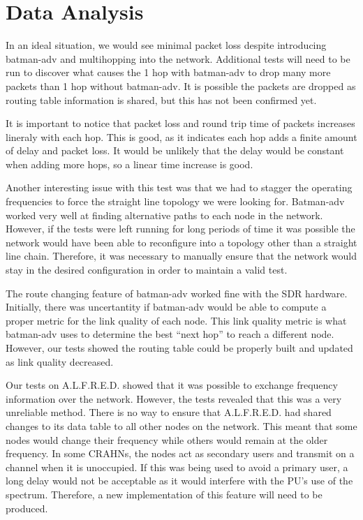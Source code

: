 
\section{Data Analysis}

In an ideal situation, we would see minimal packet loss despite introducing batman-adv and multihopping into the network. Additional tests will need to be run to discover what causes the 1 hop with batman-adv to drop many more packets than 1 hop without batman-adv. It is possible the packets are dropped as routing table information is shared, but this has not been confirmed yet. 

It is important to notice that packet loss and round trip time of packets increases lineraly with each hop. This is good, as it indicates each hop adds a finite amount of delay and packet loss. It would be unlikely that the delay would be constant when adding more hops, so a linear time increase is good. 

Another interesting issue with this test was that we had to stagger the operating frequencies to force the straight line topology we were looking for. Batman-adv worked very well at finding alternative paths to each node in the network. However, if the tests were left running for long periods of time it was possible the network would have been able to reconfigure into a topology other than a straight line chain. Therefore, it was necessary to manually ensure that the network would stay in the desired configuration in order to maintain a valid test. 

The route changing feature of batman-adv worked fine with the SDR hardware. Initially, there was uncertantity if batman-adv would be able to compute a proper metric for the link quality of each node. This link quality metric is what batman-adv uses to determine the best ``next hop'' to reach a different node. However, our tests showed the routing table could be properly built and updated as link quality decreased.

Our tests on A.L.F.R.E.D. showed that it was possible to exchange frequency information over the network. However, the tests revealed that this was a very unreliable method. There is no way to ensure that A.L.F.R.E.D. had shared changes to its data table to all other nodes on the network. This meant that some nodes would change their frequency while others would remain at the older frequency. In some CRAHNs, the nodes act as secondary users and transmit on a channel when it is unoccupied. If this was being used to avoid a primary user, a long delay would not be acceptable as it would interfere with the PU's use of the spectrum. Therefore, a new implementation of this feature will need to be produced. 



